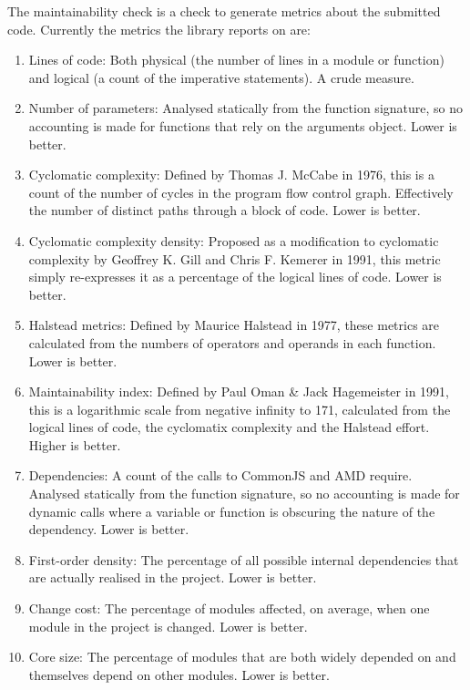 The maintainability check is a check to generate metrics about the submitted code.
Currently the metrics the library reports on are:
\begin{enumerate}
 \item Lines of code: Both physical (the number of lines in a module or function) and logical (a count of the imperative statements). A crude measure.
 \item Number of parameters: Analysed statically from the function signature, so no accounting is made for functions that rely on the arguments object. Lower is better.
 \item Cyclomatic complexity: Defined by Thomas J. McCabe in 1976, this is a count of the number of cycles in the program flow control graph. Effectively the number of distinct paths through a block of code. Lower is better.
 \item Cyclomatic complexity density: Proposed as a modification to cyclomatic complexity by Geoffrey K. Gill and Chris F. Kemerer in 1991, this metric simply re-expresses it as a percentage of the logical lines of code. Lower is better.
 \item Halstead metrics: Defined by Maurice Halstead in 1977, these metrics are calculated from the numbers of operators and operands in each function. Lower is better.
 \item Maintainability index: Defined by Paul Oman \& Jack Hagemeister in 1991, this is a logarithmic scale from negative infinity to 171, calculated from the logical lines of code, the cyclomatix complexity and the Halstead effort. Higher is better.
 \item Dependencies: A count of the calls to CommonJS and AMD require. Analysed statically from the function signature, so no accounting is made for dynamic calls where a variable or function is obscuring the nature of the dependency. Lower is better.
 \item First-order density: The percentage of all possible internal dependencies that are actually realised in the project. Lower is better.
 \item Change cost: The percentage of modules affected, on average, when one module in the project is changed. Lower is better.
 \item Core size: The percentage of modules that are both widely depended on and themselves depend on other modules. Lower is better.
\end{enumerate}

